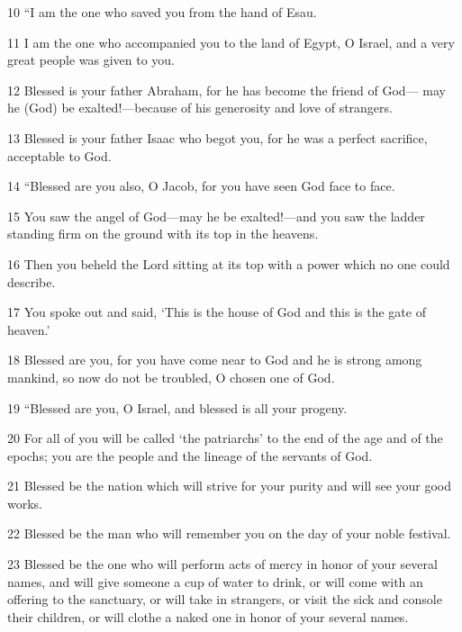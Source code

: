 \par 10 “I am the one who saved you from the hand of Esau. 

\par 11 I am the one who accompanied you to the land of Egypt, O Israel, and a very great people was given to you. 

\par 12 Blessed is your father Abraham, for he has become the friend of God— may he (God) be exalted!—because of his generosity and love of strangers. 

\par 13 Blessed is your father Isaac who begot you, for he was a perfect sacrifice, acceptable to God. 

\par 14 “Blessed are you also, O Jacob, for you have seen God face to face. 

\par 15 You saw the angel of God—may he be exalted!—and you saw the ladder standing firm on the ground with its top in the heavens. 

\par 16 Then you beheld the Lord sitting at its top with a power which no one could describe. 

\par 17 You spoke out and said, ‘This is the house of God and this is the gate of heaven.’ 

\par 18 Blessed are you, for you have come near to God and he is strong among mankind, so now do not be troubled, O chosen one of God. 

\par 19 “Blessed are you, O Israel, and blessed is all your progeny. 

\par 20 For all of you will be called ‘the patriarchs’ to the end of the age and of the epochs; you are the people and the lineage of the servants of God. 

\par 21 Blessed be the nation which will strive for your purity and will see your good works. 

\par 22 Blessed be the man who will remember you on the day of your noble festival. 

\par 23 Blessed be the one who will perform acts of mercy in honor of your several names, and will give someone a cup of water to drink, or will come with an offering to the sanctuary, or will take in strangers, or visit the sick and console their children, or will clothe a naked one in honor of your several names. 

